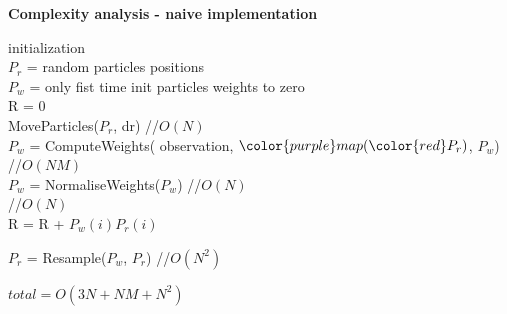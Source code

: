 \documentclass[xcolor=dvipsnames]{beamer}
\begin{document}
\begin{frame}{\bf Complexity analysis - naive implementation}


\begin{algorithm}[H]
 initialization  \\
                 {\color{red}$P_r$} = random particles positions \\
                 {\color{blue}$P_w$} = only fist time init particles weights to zero \\
                  R = 0 \\
 MoveParticles({\color{red}$P_r$}, {\color{red}dr}) //{\color{red}\bf$O(N)$} \\
 {\color{blue}$P_w$} = ComputeWeights({\color{green} observation}, ${\color{purple}map}({\color{red}P_r})$, {\color{blue}$P_w$}) //{\color{red}\bf $O(NM)$}  \\
 {\color{blue}$P_w$} = NormaliseWeights({\color{blue}$P_w$}) //{\color{red}\bf$O(N)$} \\
 //{\color{red}\bf$O(N)$} \\
 {
  R = R + {\color{blue}$P_w(i)$}{\color{red}$P_r(i)$}
 }

 {\color{red}$P_r$} = Resample({\color{blue}$P_w$}, {\color{red}$P_r$}) //{\color{red}\bf$O(N^2)$}


\end{algorithm}
\bigskip
$total = O(3N + NM + N^2)$


\end{frame}
\end{document}
